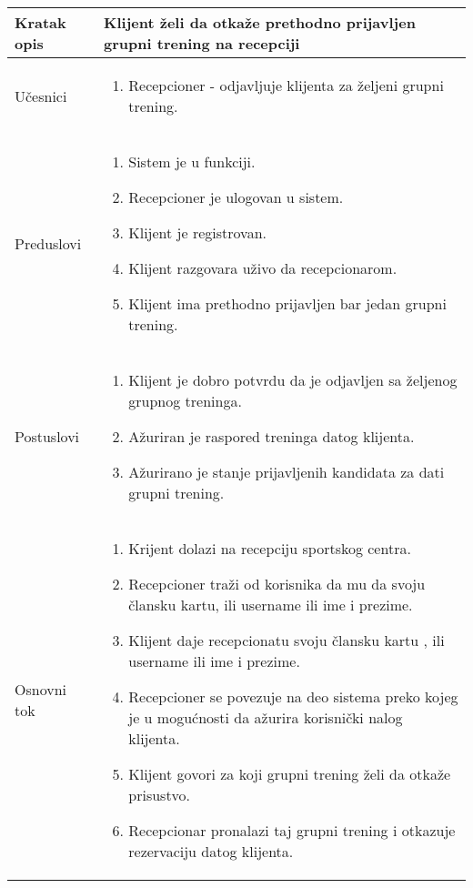 \documentclass[../grupniTreninzi.tex]{subfiles}
\begin{document}
\begin{longtable}{| p{} | p{} |} 
\hline
    Kratak opis &  Klijent želi da otkaže prethodno prijavljen grupni trening na recepciji\\ 
\hline    
    Učesnici &
    \begin{enumerate}
        \item Recepcioner - odjavljuje klijenta za željeni grupni trening.
    \end{enumerate}\\
\hline
   Preduslovi & 
   \begin{enumerate}
        \item Sistem je u funkciji.
        \item Recepcioner je ulogovan u sistem.
        \item Klijent je registrovan.
        \item Klijent razgovara uživo da recepcionarom.
        \item Klijent ima prethodno prijavljen bar jedan grupni trening.
    \end{enumerate}\\
\hline  
    Postuslovi &
    \begin{enumerate}
        \item Klijent je dobro potvrdu da je odjavljen sa željenog grupnog treninga.
        \item Ažuriran je raspored treninga datog klijenta.
        \item Ažurirano je stanje prijavljenih kandidata za dati grupni trening.
    \end{enumerate}\\
\hline
    Osnovni tok & 
    \begin{enumerate}
        \item Krijent dolazi na recepciju sportskog centra.
        \item Recepcioner traži od korisnika da mu da svoju člansku kartu, ili username ili ime i prezime.
        \item Klijent daje recepcionatu svoju člansku kartu , ili username ili ime i prezime.
        \item Recepcioner se povezuje na deo sistema preko kojeg je u mogućnosti da ažurira korisnički nalog klijenta.
        \item Klijent govori za koji grupni trening želi da otkaže prisustvo.
        \item Recepcionar pronalazi taj grupni trening i otkazuje rezervaciju datog klijenta.

\end{enumerate}
\end{longtable}
\end{document}
